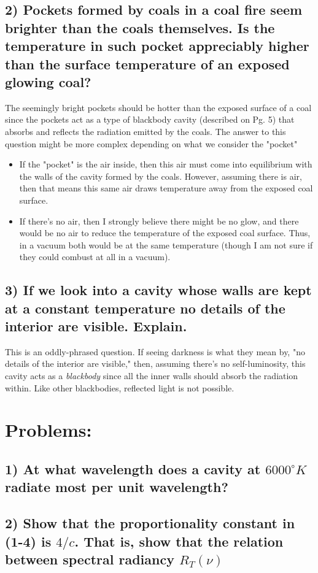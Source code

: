 \documentclass{report}
\begin{document}
\subsection*{2) Pockets formed by coals in a coal fire seem brighter than the coals themselves. Is the temperature in such pocket appreciably higher than the surface temperature of an exposed glowing coal?}
The seemingly bright pockets should be hotter than the exposed surface of a coal since the pockets act as a type of blackbody cavity (described on Pg. 5) that absorbs and reflects the radiation emitted by the coals. The answer to this question might be more complex depending on what we consider the "pocket"
\begin{itemize}
    \item If the "pocket" is the air inside, then this air must come into equilibrium with the walls of the cavity formed by the coals. However, assuming there is air, then that means this same air draws temperature away from the exposed coal surface.
    \item If there's no air, then I strongly believe there might be no glow, and there would be no air to reduce the temperature of the exposed coal surface. Thus, in a vacuum both would be at the same temperature (though I am not sure if they could combust at all in a vacuum).
\end{itemize}
\subsection*{3) If we look into a cavity whose walls are kept at a constant temperature no details of the interior are visible. Explain.}
This is an oddly-phrased question. If seeing darkness is what they mean by, "no details of the interior are visible," then, assuming there's no self-luminosity, this cavity acts as a \textit{blackbody} since all the inner walls should absorb the radiation within. Like other blackbodies, reflected light is not possible.
\section*{Problems:}
\subsection*{1) At what wavelength does a cavity at \(6000^\circ K\) radiate most per unit wavelength?}
\subsection*{2) Show that the proportionality constant in (1-4) is \(4/c\). That is, show that the relation between spectral radiancy \(R_T(\nu)\)}
\end{document}
